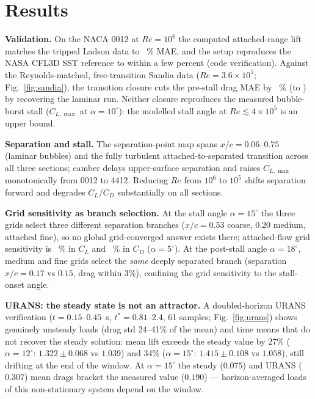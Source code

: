 \documentclass[10pt,a4paper]{article}
\begin{document}
\section{Results}
\vspace{-0.4em}

\textbf{Validation.} On the NACA 0012 at $Re = 10^6$ the computed attached-range lift matches the tripped Ladson data to \ClMAEpct{}~\% MAE, and the setup reproduces the NASA CFL3D SST reference to within a few percent (code verification). Against the Reynolds-matched, free-transition Sandia data ($Re = 3.6\times10^5$; Fig.~\ref{fig:sandia}), the transition closure cuts the pre-stall drag MAE by \SandiaCdErrDropPct{}~\% (to \SandiaCdMaeTR) by recovering the laminar run. Neither closure reproduces the measured bubble-burst stall ($C_{L,\max}$ at $\alpha = 10^\circ$): the modelled stall angle at $Re \lesssim 4\times10^5$ is an upper bound.

\textbf{Separation and stall.} The separation-point map spans $x/c = 0.06$--$0.75$ (laminar bubbles) and the fully turbulent attached-to-separated transition across all three sections; camber delays upper-surface separation and raises $C_{L,\max}$ monotonically from 0012 to 4412. Reducing $Re$ from $10^6$ to $10^5$ shifts separation forward and degrades $C_L/C_D$ substantially on all sections.

\textbf{Grid sensitivity as branch selection.} At the stall angle $\alpha = 15^\circ$ the three grids select three different separation branches ($x/c = 0.53$ coarse, $0.20$ medium, attached fine), so no global grid-converged answer exists there; attached-flow grid sensitivity is \ClGridDelta{}~\% in $C_L$ and \CdGridDelta{}~\% in $C_D$ ($\alpha = 5^\circ$). At the post-stall angle $\alpha = 18^\circ$, medium and fine grids select the \emph{same} deeply separated branch (separation $x/c = 0.17$ vs $0.15$, drag within 3\%), confining the grid sensitivity to the stall-onset angle.

\textbf{URANS: the steady state is not an attractor.} A doubled-horizon URANS verification ($t = 0.15$--$0.45$~s, $t^* = 0.81$--$2.4$, 61 samples; Fig.~\ref{fig:urans}) shows genuinely unsteady loads (drag std 24--41\% of the mean) and time means that do not recover the steady solution: mean lift exceeds the steady value by 27\% ($\alpha = 12^\circ$: $1.322 \pm 0.068$ vs $1.039$) and 34\% ($\alpha = 15^\circ$: $1.415 \pm 0.108$ vs $1.058$), still drifting at the end of the window. At $\alpha = 15^\circ$ the steady ($0.075$) and URANS ($0.307$) mean drags bracket the measured value ($0.190$) --- horizon-averaged loads of this non-stationary system depend on the window.
\end{document}
